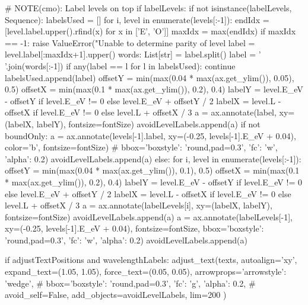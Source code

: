 \begin{pycode}[FlareObs]
    # NOTE(cmo): Label levels on top
    if labelLevels:
        if not isinstance(labelLevels, Sequence):
            labelsUsed = []
            for i, level in enumerate(levels[:-1]):
                endIdx = [level.label.upper().rfind(x) for x in ['E', 'O']]
                maxIdx = max(endIdx)
                if maxIdx == -1:
                    raise ValueError("Unable to determine parity of level %
                label = level.label[:maxIdx+1].upper()
                words: List[str] = label.split()
                label = ' '.join(words[:-1])
                if any(label == l for l in labelsUsed):
                    continue
                labelsUsed.append(label)
                offsetY = min(max(0.04 * max(ax.get_ylim()), 0.05), 0.5)
                offsetX = min(max(0.1 * max(ax.get_ylim()), 0.2), 0.4)
                labelY = level.E_eV - offsetY if level.E_eV != 0 else level.E_eV + offsetY / 2
                labelX = level.L - offsetX if level.E_eV != 0 else level.L + offsetX / 3
                a = ax.annotate(label, xy=(labelX, labelY), fontsize=fontSize)
                avoidLevelLabels.append(a)
            if not boundOnly:
                a = ax.annotate(levels[-1].label, xy=(-0.25, levels[-1].E_eV + 0.04), color='b', fontsize=fontSize)
                # bbox={'boxstyle': 'round,pad=0.3', 'fc': 'w', 'alpha': 0.2})
                avoidLevelLabels.append(a)
        else:
            for i, level in enumerate(levels[:-1]):
                offsetY = min(max(0.04 * max(ax.get_ylim()), 0.1), 0.5)
                offsetX = min(max(0.1 * max(ax.get_ylim()), 0.2), 0.4)
                labelY = level.E_eV - offsetY if level.E_eV != 0 else level.E_eV + offsetY / 2
                labelX = level.L - offsetX if level.E_eV != 0 else level.L + offsetX / 3
                a = ax.annotate(labelLevels[i], xy=(labelX, labelY), fontsize=fontSize)
                avoidLevelLabels.append(a)
            a = ax.annotate(labelLevels[-1], xy=(-0.25, levels[-1].E_eV + 0.04), fontsize=fontSize, bbox={'boxstyle': 'round,pad=0.3', 'fc': 'w', 'alpha': 0.2})
            avoidLevelLabels.append(a)


    if adjustTextPositions and wavelengthLabels:
        adjust_text(texts, autoalign='xy', expand_text=(1.05, 1.05),
                    force_text=(0.05, 0.05), arrowprops={'arrowstyle': 'wedge'},
                    # bbox={'boxstyle': 'round,pad=0.3', 'fc': 'g', 'alpha': 0.2},
                    # avoid_self=False,
                    add_objects=avoidLevelLabels, lim=200 )


\end{pycode}

